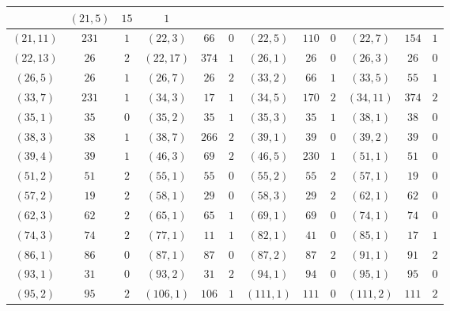\documentclass[11pt,reqno]{amsart}
\theoremstyle{definition}
\begin{document}
{\begin{longtable}{|c|c|c||c|c|c||c|c|c||c|c|c|}
 & 
$ (
21 , 5 )$ & $
15 $ & $ 1 $
\\ \hline
$ (
21 , 11 )$ & $
231 $ & $ 1 $
&
$ (
22 , 3 )$ & $
66 $ & $ 0 $
&
$ (
22 , 5 )$ & $
110 $ & $ 0 $
 & 
$ (
22 , 7 )$ & $
154 $ & $ 1 $
\\ \hline
$ (
22 , 13 )$ & $
26 $ & $ 2 $
 & 
$ (
22 , 17 )$ & $
374 $ & $ 1 $
&
$ (
26 , 1 )$ & $
26 $ & $ 0 $
&
$ (
26 , 3 )$ & $
26 $ & $ 0 $
\\ \hline
$ (
26 , 5 )$ & $
26 $ & $ 1 $
 & 
$ (
26 , 7 )$ & $
26 $ & $ 2 $
&
$ (
33 , 2 )$ & $
66 $ & $ 1 $
 & 
$ (
33 , 5 )$ & $
55 $ & $ 1 $
\\ \hline
$ (
33 , 7 )$ & $
231 $ & $ 1 $
&
$ (
34 , 3 )$ & $
17 $ & $ 1 $
&
$ (
34 , 5 )$ & $
170 $ & $ 2 $
 & 
$ (
34 , 11 )$ & $
374 $ & $ 2 $
\\ \hline
$ (
35 , 1 )$ & $
35 $ & $ 0 $
 & 
$ (
35 , 2 )$ & $
35 $ & $ 1 $
&
$ (
35 , 3 )$ & $
35 $ & $ 1 $
&
$ (
38 , 1 )$ & $
38 $ & $ 0 $
\\ \hline
$ (
38 , 3 )$ & $
38 $ & $ 1 $
 & 
$ (
38 , 7 )$ & $
266 $ & $ 2 $
&
$ (
39 , 1 )$ & $
39 $ & $ 0 $
 & 
$ (
39 , 2 )$ & $
39 $ & $ 0 $
\\ \hline
$ (
39 , 4 )$ & $
39 $ & $ 1 $
&
$ (
46 , 3 )$ & $
69 $ & $ 2 $
&
$ (
46 , 5 )$ & $
230 $ & $ 1 $
 & 
$ (
51 , 1 )$ & $
51 $ & $ 0 $
\\ \hline
$ (
51 , 2 )$ & $
51 $ & $ 2 $
 & 
$ (
55 , 1 )$ & $
55 $ & $ 0 $
&
$ (
55 , 2 )$ & $
55 $ & $ 2 $
&
$ (
57 , 1 )$ & $
19 $ & $ 0 $
\\ \hline
$ (
57 , 2 )$ & $
19 $ & $ 2 $
 & 
$ (
58 , 1 )$ & $
29 $ & $ 0 $
&
$ (
58 , 3 )$ & $
29 $ & $ 2 $
 & 
$ (
62 , 1 )$ & $
62 $ & $ 0 $
\\ \hline
$ (
62 , 3 )$ & $
62 $ & $ 2 $
&
$ (
65 , 1 )$ & $
65 $ & $ 1 $
&
$ (
69 , 1 )$ & $
69 $ & $ 0 $
 & 
$ (
74 , 1 )$ & $
74 $ & $ 0 $
\\ \hline
$ (
74 , 3 )$ & $
74 $ & $ 2 $
 & 
$ (
77 , 1 )$ & $
11 $ & $ 1 $
&
$ (
82 , 1 )$ & $
41 $ & $ 0 $
&
$ (
85 , 1 )$ & $
17 $ & $ 1 $
\\ \hline
$ (
86 , 1 )$ & $
86 $ & $ 0 $
 & 
$ (
87 , 1 )$ & $
87 $ & $ 0 $
&
$ (
87 , 2 )$ & $
87 $ & $ 2 $
 & 
$ (
91 , 1 )$ & $
91 $ & $ 2 $
\\ \hline
$ (
93 , 1 )$ & $
31 $ & $ 0 $
&
$ (
93 , 2 )$ & $
31 $ & $ 2 $
&
$ (
94 , 1 )$ & $
94 $ & $ 0 $
 & 
$ (
95 , 1 )$ & $
95 $ & $ 0 $
\\ \hline
$ (
95 , 2 )$ & $
95 $ & $ 2 $
 & 
$ (
106 , 1 )$ & $
106 $ & $ 1 $
&
$ (
111 , 1 )$ & $
111 $ & $ 0 $
&
$ (
111 , 2 )$ & $
111 $ & $ 2 $

\end{longtable}}
\end{document}
